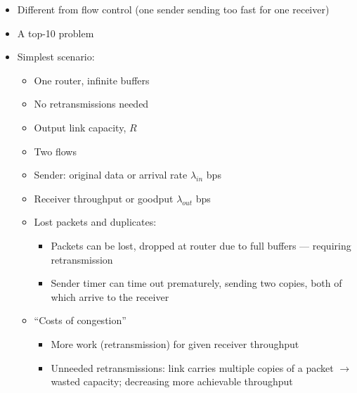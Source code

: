 \begin{itemize}
\begin{itemize}
\begin{itemize}
        \end{itemize}

      \item Different from flow control (one sender sending too fast for one receiver)

      \item A top-10 problem

      \item Simplest scenario:

        \begin{itemize}

          \item One router, infinite buffers

          \item No retransmissions needed

          \item Output link capacity, $R$

          \item Two flows

          \item Sender: original data or arrival rate $\lambda_{in}$ bps

          \item Receiver throughput or goodput $\lambda_{out}$ bps

          \item Lost packets and duplicates:

            \begin{itemize}

              \item Packets can be lost, dropped at router due to full buffers — requiring retransmission

              \item Sender timer can time out prematurely, sending two copies, both of which arrive to the receiver

            \end{itemize}

          \item ``Costs of congestion''

            \begin{itemize}

              \item More work (retransmission) for given receiver throughput

              \item Unneeded retransmissions: link carries multiple copies of a packet $\to$ wasted capacity; decreasing more achievable throughput


\end{itemize}
\end{itemize}
\end{itemize}
\end{itemize}
